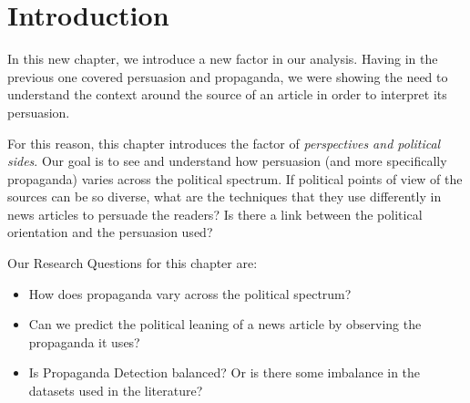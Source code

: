 \label{chap:political_sides}

\section{Introduction}


In this new chapter, we introduce a new factor in our analysis.
Having in the previous one covered persuasion and propaganda, we were showing the need to understand the context around the source of an article in order to interpret its persuasion.

For this reason, this chapter introduces the factor of \emph{perspectives and political sides}.
Our goal is to see and understand how persuasion (and more specifically propaganda) varies across the political spectrum. If political points of view of the sources can be so diverse, what are the techniques that they use differently in news articles to persuade the readers? Is there a link between the political orientation and the persuasion used?


Our Research Questions for this chapter are:
\begin{itemize}
    \item How does propaganda vary across the political spectrum?
    \item Can we predict the political leaning of a news article by observing the propaganda it uses?
    \item Is Propaganda Detection balanced? Or is there some imbalance in the datasets used in the literature?
\end{itemize}


